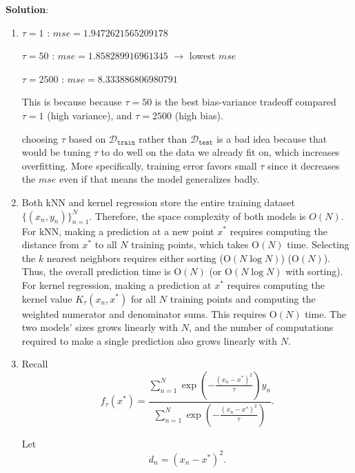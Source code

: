 \documentclass[submit]{harvardml}
\newenvironment{solution}{
    \vspace{2mm}
    \color{blue}\noindent\textbf{Solution}:
}{}
\begin{document}
\begin{solution}
\begin{enumerate}
\begin{enumerate}
            \[
\hat{y}'_m \;=\;
\frac{\sum_{n=1}^{N} K_{\tau}(x_n, x'_m)\, y_n}
{\sum_{n=1}^{N} K_{\tau}(x_n, x'_m)}
\]

So the $mse$ over test is:
\[
\mathrm{MSE}(\tau)
\;=\;
\frac{1}{M}\sum_{m=1}^{M}
\left(
y'_m
-
\frac{\sum_{n=1}^{N} K_{\tau}(x_n, x'_m)\, y_n}
{\sum_{n=1}^{N} K_{\tau}(x_n, x'_m)}
\right)^2
\]

        \item $\tau=1$ : $mse= 1.9472621565209178$
        \smallskip
        
        $\tau=50$ : $mse= 1.858289916961345$ $\rightarrow  $ lowest $mse$
        \smallskip
        
        $\tau=2500$ : $mse = 8.333886806980791$

        This is because because $\tau= 50$ is the best bias-variance tradeoff compared $\tau=1$ (high variance), and $\tau=2500$ (high bias).
        \smallskip

        choosing $\tau$ based on $\mathcal{D}_\texttt{train}$ rather than $\mathcal{D}_\texttt{test}$ is a bad idea because that would be tuning $\tau$ to do well on the data we already fit on, which increases overfitting. More specifically, training error favors small $\tau$ since it decreases the $mse$ even if that means the model generalizes badly.
        \item Both kNN and kernel regression store the entire training dataset 
$\{(x_n, y_n)\}_{n=1}^{N}$. Therefore, the space complexity of both models 
is $\mathrm{}{O}(N)$. For kNN, making a prediction at a new point $x^*$ requires computing the 
distance from $x^*$ to all $N$ training points, which takes 
$\mathrm{O}(N)$ time. Selecting the $k$ nearest neighbors requires either 
sorting ($\mathrm{O}(N \log N)$)
($\mathrm{O}(N)$). Thus, the overall prediction time is 
$\mathrm{O}(N)$ (or $\mathrm{O}(N \log N)$ with  sorting). For kernel regression, making a prediction at $x^*$ requires computing 
the kernel value $K_\tau(x_n, x^*)$ for all $N$ training points and 
computing the weighted numerator and denominator sums. This requires 
$\mathrm{O}(N)$ time. The two models' sizes grows linearly with $N$, and the number of 
computations required to make a single prediction also grows linearly 
with $N$.

\item Recall
\[
f_\tau(x^*)
=
\frac{\sum_{n=1}^{N} 
\exp\!\left(-\frac{(x_n - x^*)^2}{\tau}\right) y_n}
{\sum_{n=1}^{N} 
\exp\!\left(-\frac{(x_n - x^*)^2}{\tau}\right)}.
\]

Let
\[
d_n = (x_n - x^*)^2.
\]


\end{enumerate}
\end{enumerate}
\end{solution}
\end{document}
